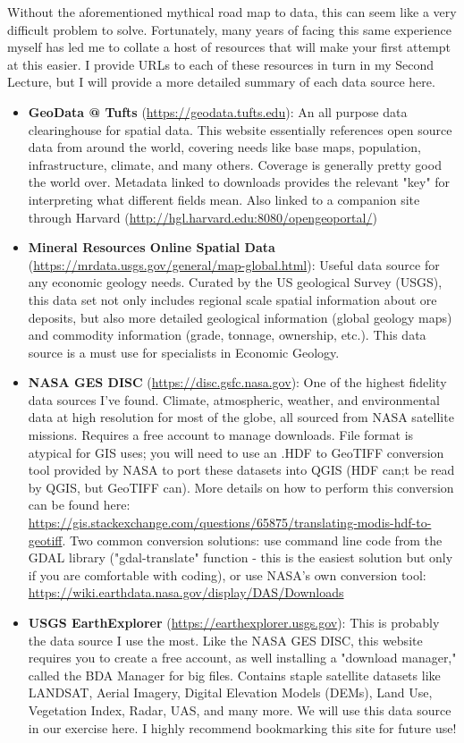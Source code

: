 \documentclass{article}
\begin{document}
Without the aforementioned mythical road map to data, this can seem like a very difficult problem to solve. Fortunately, many years of facing this same experience myself has led me to collate a host of resources that will make your first attempt at this easier. I provide URLs to each of these resources in turn in my Second Lecture, but I will provide a more detailed summary of each data source here. 

\begin{itemize}
    \item \textbf{GeoData @ Tufts} (\url{https://geodata.tufts.edu}): An all purpose data clearinghouse for spatial data. This website essentially references open source data from around the world, covering needs like base maps, population, infrastructure, climate, and many others. Coverage is generally pretty good the world over. Metadata linked to downloads provides the relevant "key" for interpreting what different fields mean. Also linked to a companion site through Harvard (\url{http://hgl.harvard.edu:8080/opengeoportal/})
    \item \textbf{Mineral Resources Online Spatial Data} (\url{https://mrdata.usgs.gov/general/map-global.html}): Useful data source for any economic geology needs. Curated by the US geological Survey (USGS), this data set not only includes regional scale spatial information about ore deposits, but also more detailed geological information (global geology maps) and commodity information (grade, tonnage, ownership, etc.). This data source is a must use for specialists in Economic Geology.
    \item \textbf{NASA GES DISC} (\url{https://disc.gsfc.nasa.gov}): One of the highest fidelity data sources I've found. Climate, atmospheric, weather, and environmental data at high resolution for most of the globe, all sourced from NASA satellite missions. Requires a free account to manage downloads. File format is atypical for GIS uses; you will need to use an .HDF to GeoTIFF conversion tool provided by NASA to port these datasets into QGIS (HDF can;t be read by QGIS, but GeoTIFF can). More details on how to perform this conversion can be found here: \url{https://gis.stackexchange.com/questions/65875/translating-modis-hdf-to-geotiff}. Two common conversion solutions: use command line code from the GDAL library ("gdal-translate" function - this is the easiest solution but only if you are comfortable with coding), or use NASA's own conversion tool: \url{https://wiki.earthdata.nasa.gov/display/DAS/Downloads}
    \item \textbf{USGS EarthExplorer} (\url{https://earthexplorer.usgs.gov}): This is probably the data source I use the most. Like the NASA GES DISC, this website requires you to create a free account, as well installing a "download manager," called the BDA Manager for big files. Contains staple satellite datasets like LANDSAT, Aerial Imagery, Digital Elevation Models (DEMs), Land Use, Vegetation Index, Radar, UAS, and many more. We will use this data source in our exercise here. I highly recommend bookmarking this site for future use!

\end{itemize}
\end{document}
